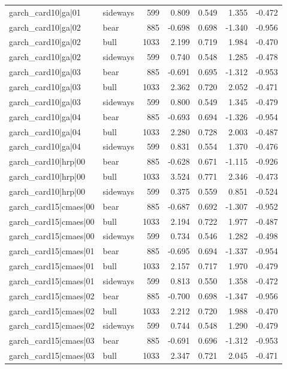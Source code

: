 \begin{table}
\begin{tabular}{llrrrrr}
garch\_card10|ga|01 & sideways & 599 & 0.809 & 0.549 & 1.355 & -0.472 \\
garch\_card10|ga|02 & bear & 885 & -0.698 & 0.698 & -1.340 & -0.956 \\
garch\_card10|ga|02 & bull & 1033 & 2.199 & 0.719 & 1.984 & -0.470 \\
garch\_card10|ga|02 & sideways & 599 & 0.740 & 0.548 & 1.285 & -0.478 \\
garch\_card10|ga|03 & bear & 885 & -0.691 & 0.695 & -1.312 & -0.953 \\
garch\_card10|ga|03 & bull & 1033 & 2.362 & 0.720 & 2.052 & -0.471 \\
garch\_card10|ga|03 & sideways & 599 & 0.800 & 0.549 & 1.345 & -0.479 \\
garch\_card10|ga|04 & bear & 885 & -0.693 & 0.694 & -1.326 & -0.954 \\
garch\_card10|ga|04 & bull & 1033 & 2.280 & 0.728 & 2.003 & -0.487 \\
garch\_card10|ga|04 & sideways & 599 & 0.831 & 0.554 & 1.370 & -0.476 \\
garch\_card10|hrp|00 & bear & 885 & -0.628 & 0.671 & -1.115 & -0.926 \\
garch\_card10|hrp|00 & bull & 1033 & 3.524 & 0.771 & 2.346 & -0.473 \\
garch\_card10|hrp|00 & sideways & 599 & 0.375 & 0.559 & 0.851 & -0.524 \\
garch\_card15|cmaes|00 & bear & 885 & -0.687 & 0.692 & -1.307 & -0.952 \\
garch\_card15|cmaes|00 & bull & 1033 & 2.194 & 0.722 & 1.977 & -0.487 \\
garch\_card15|cmaes|00 & sideways & 599 & 0.734 & 0.546 & 1.282 & -0.498 \\
garch\_card15|cmaes|01 & bear & 885 & -0.695 & 0.694 & -1.337 & -0.954 \\
garch\_card15|cmaes|01 & bull & 1033 & 2.157 & 0.717 & 1.970 & -0.479 \\
garch\_card15|cmaes|01 & sideways & 599 & 0.813 & 0.550 & 1.358 & -0.472 \\
garch\_card15|cmaes|02 & bear & 885 & -0.700 & 0.698 & -1.347 & -0.956 \\
garch\_card15|cmaes|02 & bull & 1033 & 2.212 & 0.720 & 1.988 & -0.470 \\
garch\_card15|cmaes|02 & sideways & 599 & 0.744 & 0.548 & 1.290 & -0.479 \\
garch\_card15|cmaes|03 & bear & 885 & -0.691 & 0.696 & -1.312 & -0.953 \\
garch\_card15|cmaes|03 & bull & 1033 & 2.347 & 0.721 & 2.045 & -0.471 \\

\end{tabular}
\end{table}
